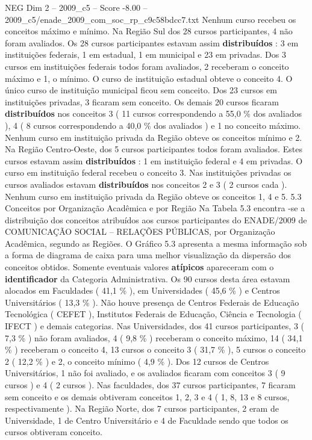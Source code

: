 \begin{textsample}{NEG Dim 2 – 2009\_c5 – Score -8.00 – 2009\_c5/enade\_2009\_com\_soc\_rp\_c9c58bdcc7.txt}
Nenhum curso recebeu os conceitos máximo e mínimo.
Na Região Sul dos 28 cursos participantes, 4 não foram avaliados.
Os 28 cursos participantes estavam assim \textbf{distribuídos} : 3 em instituições federais, 1 em estadual, 1 em municipal e 23 em privadas.
Dos 3 cursos em instituições federais todos foram avaliados, 2 receberam o conceito máximo e 1, o mínimo.
O curso de instituição estadual obteve o conceito 4.
O único curso de instituição municipal ficou sem conceito.
Dos 23 cursos em instituições privadas, 3 ficaram sem conceito.
Os demais 20 cursos ficaram \textbf{distribuídos} nos conceitos 3 ( 11 cursos correspondendo a 55,0 \% dos avaliados ), 4 ( 8 cursos correspondendo a 40,0 \% dos avaliados ) e 1 no conceito máximo.
Nenhum curso em instituição privada da Região obteve os conceitos mínimo e 2.
Na Região Centro-Oeste, dos 5 cursos participantes todos foram avaliados.
Estes cursos estavam assim \textbf{distribuídos} : 1 em instituição federal e 4 em privadas.
O curso em instituição federal recebeu o conceito 3.
Nas instituições privadas os cursos avaliados estavam \textbf{distribuídos} nos conceitos 2 e 3 ( 2 cursos cada ).
Nenhum curso em instituição privada da Região obteve os conceitos 1, 4 e 5. 5.3 Conceitos por Organização Acadêmica e por Região Na Tabela 5.3 encontra -se a distribuição dos conceitos atribuídos aos cursos participantes do ENADE/2009 de COMUNICAÇÃO SOCIAL – RELAÇÕES PÚBLICAS, por Organização Acadêmica, segundo as Regiões.
O Gráfico 5.3 apresenta a mesma informação sob a forma de diagrama de caixa para uma melhor visualização da dispersão dos conceitos obtidos.
Somente eventuais valores \textbf{atípicos} apareceram com o \textbf{identificador} da Categoria Administrativa.
Os 90 cursos desta área estavam alocados em Faculdades ( 41,1 \% ), em Universidades ( 45,6 \% ) e Centros Universitários ( 13,3 \% ).
Não houve presença de Centros Federais de Educação Tecnológica ( CEFET ), Institutos Federais de Educação, Ciência e Tecnologia ( IFECT ) e demais categorias.
Nas Universidades, dos 41 cursos participantes, 3 ( 7,3 \% ) não foram avaliados, 4 ( 9,8 \% ) receberam o conceito máximo, 14 ( 34,1 \% ) receberam o conceito 4, 13 cursos o conceito 3 ( 31,7 \% ), 5 cursos o conceito 2 ( 12,2 \% ) e 2, o conceito mínimo ( 4,9 \% ).
Dos 12 cursos de Centros Universitários, 1 não foi avaliado, e os avaliados ficaram com conceitos 3 ( 9 cursos ) e 4 ( 2 cursos ).
Nas faculdades, dos 37 cursos participantes, 7 ficaram sem conceito e os demais obtiveram conceitos 1, 2, 3 e 4 ( 1, 8, 13 e 8 cursos, respectivamente ).
Na Região Norte, dos 7 cursos participantes, 2 eram de Universidade, 1 de Centro Universitário e 4 de Faculdade sendo que todos os cursos obtiveram conceito.

\end{textsample}
